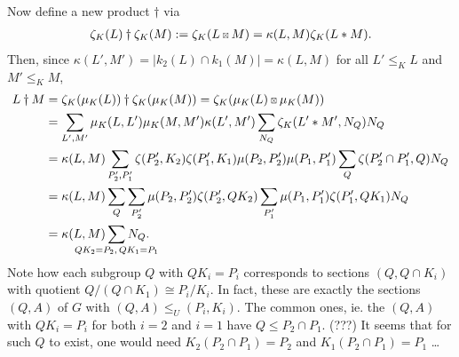 \documentclass[12pt,a4paper]{amsart}
\newcommand{\Size}[1]{\left|#1\right|}
\newcommand{\kstar}{\mathbin{\scalebox{0.61}{$\boxtimes$}}}
\begin{document}
Now define a new product $\dagger$ via
\begin{align*}
  \zeta_K(L) \dagger \zeta_K(M) := \zeta_K(L \kstar M) = \kappa(L, M) \zeta_K(L * M)\text.
\end{align*}
Then, since $\kappa(L', M') = \Size{k_2(L) \cap k_1(M)} = \kappa(L, M)$ for all $L' \leq_K L$ and $M' \leq_K M$,
\begin{align*}
  L \dagger M &= \zeta_K(\mu_K(L)) \dagger \zeta_K(\mu_K(M))
                = \zeta_K(\mu_K(L) \kstar \mu_K(M)) \\
              & =  \sum_{L', M'} \mu_K(L, L') \mu_K(M, M') \kappa(L', M')  \sum_{N_Q} \zeta_K(L' * M', N_Q) N_Q \\
              & =  \kappa(L, M) \sum_{P_2', P_1'} \zeta(P_2', K_2) \zeta(P_1', K_1) \mu(P_2, P_2') \mu(P_1, P_1') \sum_{Q} \zeta(P_2' \cap P_1', Q) N_Q \\
              & =  \kappa(L, M) \sum_{Q}  \sum_{P_2'} \mu(P_2, P_2') \zeta(P_2', QK_2) \sum_{P_1'} \mu(P_1, P_1') \zeta(P_1', QK_1) N_Q \\
              & =  \kappa(L, M) \sum_{\mathclap{Q K_2 = P_2,\, Q K_1 = P_1}} N_Q\text.
\end{align*}
Note how each subgroup $Q$ with $Q K_i = P_i$ corresponds to sections $(Q, Q \cap K_i)$ with quotient $Q/(Q \cap K_1) \cong P_i/K_i$.
In fact, these are exactly the sections $(Q, A)$ of $G$ with $(Q, A) \leq_U (P_i, K_i)$.
The common ones, ie. the $(Q, A)$ with $Q K_i = P_i$ for both $i = 2$ and $i = 1$ have $Q \leq P_2 \cap P_1$. (???)
It seems that for such $Q$ to exist, one would need $K_2(P_2 \cap P_1) = P_2$
and $K_1(P_2 \cap P_1) = P_1$ \ldots

\begin{center}
\end{center}
\end{document}
